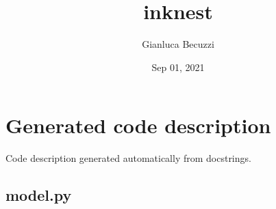 \documentclass[letterpaper,10pt,english,openany,oneside]{sphinxmanual}
\title{inknest}
\date{Sep 01, 2021}
\author{Gianluca Becuzzi}
\begin{document}
\pagestyle{empty}
\sphinxmaketitle
\pagestyle{plain}
\sphinxtableofcontents
\pagestyle{normal}
\label{\detokenize{index::doc}}



\chapter{Generated code description}
\label{\detokenize{autogen:generated-code-description}}\label{\detokenize{autogen::doc}}
Code description generated automatically from docstrings.


\section{model.py}
\label{\detokenize{autogen:module-model}}\label{\detokenize{autogen:model-py}}
\end{document}
